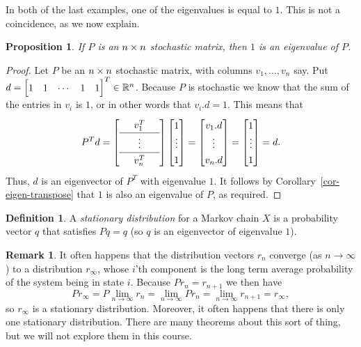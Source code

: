 \documentclass[reqno]{amsart}
\newtheorem{proposition}[theorem]{Proposition}
\theoremstyle{definition}
\newtheorem{remark}[theorem]{Remark}
\newtheorem{definition}[theorem]{Definition}
\newcommand{\dfn}[1]{\emph{{#1}}\index{#1}}
\begin{document}
In both of the last examples, one of the eigenvalues is equal to $1$.
This is not a coincidence, as we now explain.

\begin{proposition}\label{prop-stochastic-eigenvalue}
 If $P$ is an $n\times n$ stochastic matrix, then $1$ is an eigenvalue of
 $P$.
\end{proposition}
\begin{proof}
 Let $P$ be an $n\times n$ stochastic matrix, with columns
 $v_1,\dotsc,v_n$ say.  Put $d=\bbm 1&1&\cdots&1&1\ebm^T\in\R^n$.
 Because $P$ is stochastic we know that the sum of the entries in
 $v_i$ is $1$, or in other words that $v_i.d=1$.  This means that
 \[ \renewcommand{\arraystretch}{1.3}
  P^Td
  = \left[\begin{array}{ccc}
     & v_1^T  & \\ \hline
     & \vdots & \\ \hline
     & v_n^T  &
    \end{array}\right]
    \bbm 1 \\ \vdots \\ 1 \ebm
  = \bbm v_1.d \\ \vdots \\ v_n.d \ebm
  = \bbm 1 \\ \vdots \\ 1 \ebm
  = d.
 \]
 Thus, $d$ is an eigenvector of $P^T$ with eigenvalue $1$.  It follows
 by Corollary~\ref{cor-eigen-transpose} that $1$ is also an eigenvalue
 of $P$, as required.
\end{proof}

\begin{definition}\label{defn-stationary}
 A \dfn{stationary distribution} for a Markov chain $X$ is a
 probability vector $q$ that satisfies $Pq=q$ (so $q$ is an
 eigenvector of eigenvalue $1$).
\end{definition}

\begin{remark}\label{rem-stationary}
 It often happens that the distribution vectors $r_n$ converge (as
 $n\to\infty$) to a distribution $r_{\infty}$, whose $i$'th component
 is the long term average probability of the system being in state
 $i$.  Because $Pr_n=r_{n+1}$ we then have
 \[ P r_\infty = P\lim_{n\to\infty} r_n =
     \lim_{n\to\infty} Pr_n = \lim_{n\to\infty} r_{n+1} = r_\infty,
 \]
 so $r_\infty$ is a stationary distribution.  Moreover, it often
 happens that there is only one stationary distribution.  There
 are many theorems about this sort of thing, but we will not explore
 them in this course.
\end{remark}
\end{document}
